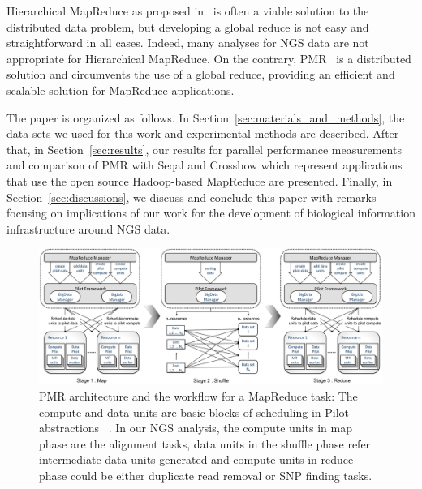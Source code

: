 \documentclass{acm_proc_article-sp}
\begin{document}
Hierarchical MapReduce as proposed in~\cite{ecmls11-mr-autodock} is
often a viable solution to the distributed data problem, but
developing a global reduce is not easy and straightforward in all
cases. Indeed, many analyses for NGS data are not appropriate for Hierarchical MapReduce. 
On the contrary, PMR~\cite{pmr2012} is a distributed solution and
circumvents the use of a global reduce, providing an efficient and scalable solution for MapReduce applications. 

The paper is organized as follows. In
Section~\ref{sec:materials_and_methods}, the data sets we used for
this work and experimental methods are described.
After that, in Section~\ref{sec:results}, our results for parallel performance
measurements and comparison of PMR with Seqal and Crossbow
which represent applications that use the open source Hadoop-based
MapReduce\cite{hadoop-url, taylor2010,seal_2011_mapred,seal2011} are
presented.  Finally, in Section~\ref{sec:discussions}, we 
discuss and conclude this paper with remarks focusing on
implications of our work for the development of biological
information infrastructure around NGS data.  

\begin{center}
\hfill{}
\begin{figure}
 \centering
\includegraphics[scale=0.35]{figures/F1_1.pdf} 
\hfill{}
\caption{\small PMR architecture and the workflow for a MapReduce task: The compute and data units are basic blocks of scheduling in Pilot abstractions ~\cite{pstar11}. In our NGS analysis, the compute units in map phase are the alignment tasks, data units in the shuffle phase refer intermediate data units generated and compute units in reduce phase could be either duplicate read removal or SNP finding tasks.}
  \label{fig:arch-pj-saga-mr} 
\end{figure}
\end{center}
\end{document}
